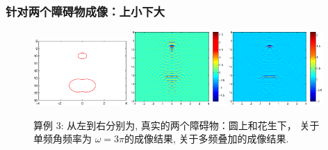 \documentclass[8pt]{beamer}
\newcommand{\om}{\omega}
\begin{document}
\begin{frame}
\frametitle{针对两个障碍物成像：上小下大}
\begin{figure}[h]
	
	\centering
	\includegraphics[width=0.32\textwidth,height=0.33\textheight]{./graphic/circle_0_4_peanut_1_profile.eps}
	\includegraphics[width=0.32\textwidth]{./graphic/circle_0_4_peanut_1_3pi_1.eps}
	\includegraphics[width=0.32\textwidth]{./graphic/circle_0_4_peanut_1_multi_1.eps}
	
	\caption{算例 3: 从左到右分别为,  真实的两个障碍物：圆上和花生下， 关于单频角频率为 $\om=3\pi$的成像结果, 关于多频叠加的成像结果.}
\end{figure}
\end{frame}
\end{document}
